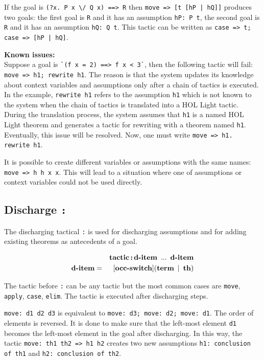 \documentclass[a4paper]{article}
\newcommand{\issues}{{\bf Known issues:}\\}
\newcommand{\xx}[1]{\mathop{\text{\bf #1}}}
\begin{document}
If the goal is \verb|(?x. P x \/ Q x) ==> R| then \verb$move => [t [hP | hQ]]$ produces two goals: the first goal is \verb|R| and it has an assumption \verb|hP: P t|, the second goal is \verb|R| and it has an assumption \verb|hQ: Q t|. This tactic can be written as \verb$case => t; case => [hP | hQ]$.


\issues
Suppose a goal is \verb|`(f x = 2) ==> f x < 3`|, then the following tactic will fail:
\verb|move => h1; rewrite h1|. The reason is that the system updates its knowledge about context variables and assumptions only after a chain of tactics is executed. In the example, \verb|rewrite h1| refers to the assumption \verb|h1| which is not known to the system when the chain of tactics is translated into a HOL Light tactic. During the translation process, the system assumes that \verb|h1| is a named HOL Light theorem and generates a tactic for rewriting with a theorem named \verb|h1|. Eventually, this issue will be resolved. Now, one must write \verb|move => h1. rewrite h1|.

It is possible to create different variables or assumptions with the same names: \verb|move => h h x x|. This will lead to a situation where one of assumptions or context variables could not be used directly.

\subsection{Discharge {\tt :}}
The discharging tactical \verb|:| is used for discharging assumptions and for adding existing theorems as antecedents of a goal.

\begin{eqnarray*}
&&\xx{tactic} \xx{:} \xx{d-item}\ ...\ \xx{d-item}\\
\xx{d-item} &=& [\xx{occ-switch}](\xx{term}\ |\ \xx{th})
\end{eqnarray*}

The tactic before \verb|:| can be any tactic but the most common cases are \verb|move|, \verb|apply|, \verb|case|, \verb|elim|. The tactic is executed after discharging steps.

\verb|move: d1 d2 d3| is equivalent to \verb|move: d3; move: d2; move: d1|. The order of elements is reversed. It is done to make sure that the left-most element \verb|d1| becomes the left-most element in the goal after discharging. In this way, the tactic \verb|move: th1 th2 => h1 h2| creates two new assumptions \verb|h1: conclusion of th1| and \verb|h2: conclusion of th2|.
\end{document}
